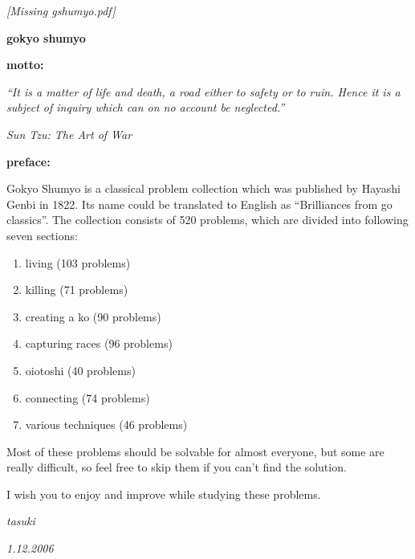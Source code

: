 \documentclass[11pt]{book}
\begin{document}
\begin{titlepage}

    \vspace*{0.2\textheight}

    \begin{center}
        \textit{\large [Missing gshumyo.pdf]}
    \end{center}
    \begin{center}
        \textbf{\huge gokyo shumyo}
    \end{center}

\end{titlepage}

\newpage %


\noindent\textbf{\Large motto:}

\medskip
\textit{\normalsize ``It is a matter of life and death, a road either to safety or to ruin. Hence it is a subject of inquiry which can on no account be neglected.''}

\medskip
\hfill {\it Sun Tzu: The Art of War}
\bigskip

\noindent\textbf{\Large preface:}

\medskip
{
\normalsize
Gokyo Shumyo is a classical problem collection which was published by Hayashi Genbi in 1822. Its name could be translated to English as ``Brilliances from go classics''. The collection consists of 520 problems, which are divided into following seven sections:

\begin{enumerate}
    \setlength{\itemsep}{0pt}
    \setlength{\parskip}{0pt}

    \item living (103 problems)
    \item killing (71 problems)
    \item creating a ko (90 problems) %
    \item capturing races (96 problems)
    \item oiotoshi (40 problems)
    \item connecting (74 problems)
    \item various techniques (46 problems)
\end{enumerate}

Most of these problems should be solvable for almost everyone, but some are really difficult, so feel free to skip them if you can't find the solution.

I wish you to enjoy and improve while studying these problems.
}

\medskip
\hfill \textit{tasuki}

\hfill \textit{1.12.2006}

\newpage %


\begin{multicols}{2}
    
\end{multicols}
\end{document}
